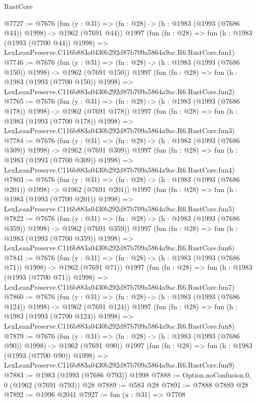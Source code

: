 \begin{lexlean}{RustCore}
\begin{coremodule}
@7727 := @7676
    (fun (y : @31) => (fn : @28) -> (h : @1983 (@1993 (@7686 @44)) @1998) -> @1962 (@7691 @44))
    @1997
    (fun (fn : @28) =>
    fun (h : @1983 (@1993 (@7700 @44)) @1998) =>
    LexLeanPreserve.C116b883a0430b292d87b709a5864a9ac.R6.RustCore.fun1)
@7746 := @7676
    (fun (y : @31) => (fn : @28) -> (h : @1983 (@1993 (@7686 @150)) @1998) -> @1962 (@7691 @150))
    @1997
    (fun (fn : @28) =>
    fun (h : @1983 (@1993 (@7700 @150)) @1998) =>
    LexLeanPreserve.C116b883a0430b292d87b709a5864a9ac.R6.RustCore.fun2)
@7765 := @7676
    (fun (y : @31) => (fn : @28) -> (h : @1983 (@1993 (@7686 @178)) @1998) -> @1962 (@7691 @178))
    @1997
    (fun (fn : @28) =>
    fun (h : @1983 (@1993 (@7700 @178)) @1998) =>
    LexLeanPreserve.C116b883a0430b292d87b709a5864a9ac.R6.RustCore.fun3)
@7784 := @7676
    (fun (y : @31) => (fn : @28) -> (h : @1983 (@1993 (@7686 @309)) @1998) -> @1962 (@7691 @309))
    @1997
    (fun (fn : @28) =>
    fun (h : @1983 (@1993 (@7700 @309)) @1998) =>
    LexLeanPreserve.C116b883a0430b292d87b709a5864a9ac.R6.RustCore.fun4)
@7803 := @7676
    (fun (y : @31) => (fn : @28) -> (h : @1983 (@1993 (@7686 @201)) @1998) -> @1962 (@7691 @201))
    @1997
    (fun (fn : @28) =>
    fun (h : @1983 (@1993 (@7700 @201)) @1998) =>
    LexLeanPreserve.C116b883a0430b292d87b709a5864a9ac.R6.RustCore.fun5)
@7822 := @7676
    (fun (y : @31) => (fn : @28) -> (h : @1983 (@1993 (@7686 @359)) @1998) -> @1962 (@7691 @359))
    @1997
    (fun (fn : @28) =>
    fun (h : @1983 (@1993 (@7700 @359)) @1998) =>
    LexLeanPreserve.C116b883a0430b292d87b709a5864a9ac.R6.RustCore.fun6)
@7841 := @7676
    (fun (y : @31) => (fn : @28) -> (h : @1983 (@1993 (@7686 @71)) @1998) -> @1962 (@7691 @71))
    @1997
    (fun (fn : @28) =>
    fun (h : @1983 (@1993 (@7700 @71)) @1998) =>
    LexLeanPreserve.C116b883a0430b292d87b709a5864a9ac.R6.RustCore.fun7)
@7860 := @7676
    (fun (y : @31) => (fn : @28) -> (h : @1983 (@1993 (@7686 @124)) @1998) -> @1962 (@7691 @124))
    @1997
    (fun (fn : @28) =>
    fun (h : @1983 (@1993 (@7700 @124)) @1998) =>
    LexLeanPreserve.C116b883a0430b292d87b709a5864a9ac.R6.RustCore.fun8)
@7879 := @7676
    (fun (y : @31) => (fn : @28) -> (h : @1983 (@1993 (@7686 @90)) @1998) -> @1962 (@7691 @90))
    @1997
    (fun (fn : @28) =>
    fun (h : @1983 (@1993 (@7700 @90)) @1998) =>
    LexLeanPreserve.C116b883a0430b292d87b709a5864a9ac.R6.RustCore.fun9)
@7883 := @1983 (@1993 (@7686 @793)) @1998
@7888 := Option.noConfusion.{0, 0} (@1962 (@7691 @793)) @28
@7889 := @583 @28
@7891 := @7888 @7889 @28
@7892 := @1996 @2041
@7927 := fun (x : @31) =>
  @7708

\end{coremodule}
\end{lexlean}
